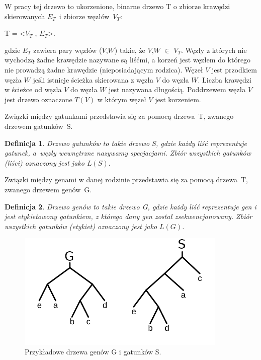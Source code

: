 \documentclass[licencjacka]{pracamgr}
\newtheorem{defi}{Definicja}[section]
\begin{document}
W pracy tej drzewo to ukorzenione, binarne drzewo T o zbiorze krawędzi skierowanych $E_T$~i zbiorze węzłów~$V_T$:
\begin{center}
T = <$V_T$ , $E_T$>.
\end{center}
gdzie $E_T$ zawiera pary węzłów ($V$,$W$) takie, że $V$,$W$ $\in$ $V_T$. Węzły z których nie wychodzą żadne krawędzie nazywane są liśćmi, a korzeń jest węzłem do którego nie prowadzą żadne krawędzie (nieposiadającym rodzica). Węzeł $V$ jest przodkiem węzła $W$ jeśli istnieje ścieżka skierowana z węzła $V$ do węzła $W$. Liczba krawędzi w ścieżce od węzła $V$ do węzła $W$ jest nazywana długością. Poddrzewem węzła $V$ jest drzewo oznaczone $T(V)$ w którym węzeł $V$ jest korzeniem. 

Związki między gatunkami przedstawia się za pomocą drzewa~T, zwanego drzewem gatunków~S.
\begin{defi}\label{Drzewa gatunków}
  Drzewo gatunków to takie drzewo S, gdzie każdy liść reprezentuje gatunek, a~węzły wewnętrzne nazywamy specjacjami. Zbiór wszystkich gatunków (liści) oznaczony jest jako $L(S)$. 
\end{defi}

Związki między genami w danej rodzinie przedstawia się za pomocą drzewa~T, zwanego drzewem genów~G.
\begin{defi}\label{Drzewa genów}
  Drzewo genów to takie drzewo G, gdzie każdy liść reprezentuje gen i jest etykietowony gatunkiem, z którego dany gen został zsekwencjonowany. Zbiór wszystkich gatunków (etykiet) oznaczony jest jako $L(G)$.
\end{defi}


\begin{figure}[H]
	\centering
	\includegraphics[width=100mm]{./pictures/spec_gen.png}
	\caption{Przykładowe drzewa genów G i gatunków S.}
\end{figure}
\end{document}
